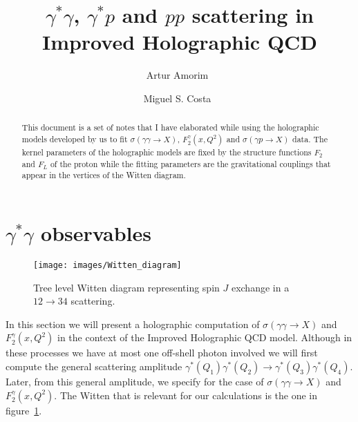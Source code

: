\documentclass[preprint, 12pt]{elsarticle}
\begin{document}
\begin{frontmatter}

\title{$\gamma^* \gamma$, $\gamma^* p$ and $pp$ scattering in Improved Holographic QCD}

\author[ath]{Artur Amorim~}
\author[ath]{Miguel S. Costa~}
\address[ath]{Centro de F\'{\i}sica do Porto e Departamento de F\'{\i}sica e Astronomia da Faculdade de Ci\^encias da Universidade do Porto, Rua do Campo Alegre 687, 4169-007 Porto, Portugal}


\begin{abstract}

This document is a set of notes that I have elaborated while using the holographic models developed by us to fit $\sigma\left(\gamma \gamma \rightarrow X\right)$, $F_2^\gamma\left(x, Q^2\right)$ and $\sigma\left(\gamma p \rightarrow X\right)$ data. The kernel parameters of the holographic models are fixed by the structure functions $F_2$ and $F_L$ of the proton while the fitting parameters are the gravitational couplings that appear in the vertices of the Witten diagram.

\end{abstract}

\end{frontmatter}

\section{$\gamma^{*}\gamma$ observables}
\begin{figure}[!h]
  \center
  \texttt{[image: images/Witten\_diagram]} 
  \caption{Tree level Witten diagram representing spin $J$    exchange in a $12\to34$ scattering. 
}
  \label{fig:Witten_diagram}
\end{figure}
In this section we will present a holographic computation of  $\sigma\left(\gamma \gamma \rightarrow X\right)$ and $F_2^\gamma\left(x, Q^2\right)$ in the context of the Improved Holographic QCD model. Although in these processes we have at most one off-shell photon involved we will first compute the general scattering amplitude $\gamma^{*}\left(Q_1\right)\gamma^{*}\left(Q_2\right) \rightarrow \gamma^{*}\left(Q_3\right) \gamma^{*}\left(Q_4\right)$. Later, from this general amplitude, we specify for the case of $\sigma\left(\gamma \gamma \rightarrow X\right)$ and $F_2^\gamma\left(x, Q^2\right)$. The Witten that is relevant for our calculations is the one in figure~\ref{fig:Witten_diagram}.
\end{document}
